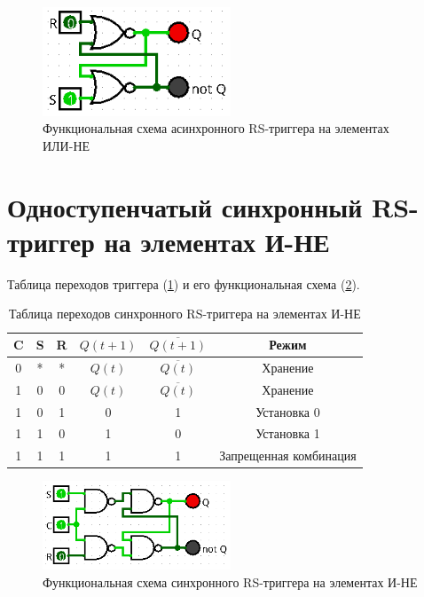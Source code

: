 \documentclass[14pt, a4paper]{extreport}
\begin{document}
\begin{figure}[H]
	\caption{Функциональная схема асинхронного RS-триггера на элементах ИЛИ-НЕ}
	\label{fig:async-rs-nor}
	\includegraphics[width=0.5\textwidth]{async-rs-nor}
\end{figure}

\section{Одноступенчатый синхронный RS-триггер на элементах И-НЕ}
Таблица переходов триггера (\cref{tab:sync-rs-nand}) и его функциональная схема (\cref{fig:sync-rs-nand}).

\begin{table}[H]
	\caption{Таблица переходов синхронного RS-триггера на элементах И-НЕ}
	\label{tab:sync-rs-nand}
	\begin{tabular}{|c|c|c|c|c|c|}
		\hline
		C & S & R & $Q(t + 1)$ & $\overline{Q(t + 1)}$ & Режим \\
		\hline
		0 & * & * & $Q(t)$ & $\overline{Q(t)}$ & Хранение \\
		\hline
		1 & 0 & 0 & $Q(t)$ & $\overline{Q(t)}$ & Хранение \\
		\hline
		1 & 0 & 1 & 0 & 1 & Установка 0 \\
		\hline
		1 & 1 & 0 & 1 & 0 & Установка 1 \\
		\hline
		1 & 1 & 1 & 1 & 1 & Запрещенная комбинация \\
		\hline
	\end{tabular}
\end{table}

\begin{figure}[H]
	\caption{Функциональная схема синхронного RS-триггера на элементах И-НЕ}
	\label{fig:sync-rs-nand}
	\includegraphics[width=0.5\textwidth]{sync-rs-nand}
\end{figure}
\end{document}
